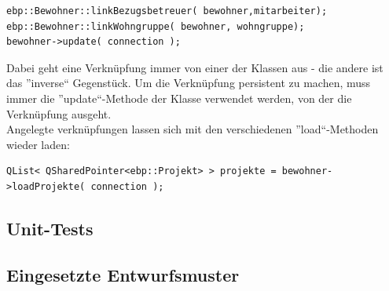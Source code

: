\begin{lstlisting}
ebp::Bewohner::linkBezugsbetreuer( bewohner,mitarbeiter);
ebp::Bewohner::linkWohngruppe( bewohner, wohngruppe);
bewohner->update( connection );
\end{lstlisting}
Dabei geht eine Verknüpfung immer von einer der Klassen aus - die andere ist das ''inverse`` Gegenstück.
Um die Verknüpfung persistent zu machen, muss immer die ''update``-Methode der Klasse verwendet werden, von der die Verknüpfung ausgeht.\\
Angelegte verknüpfungen lassen sich mit den verschiedenen ''load``-Methoden wieder laden:\\
\begin{lstlisting}
QList< QSharedPointer<ebp::Projekt> > projekte = bewohner->loadProjekte( connection );
\end{lstlisting}

\newpage

\subsection{Unit-Tests}

\newpage

\subsection{Eingesetzte Entwurfsmuster}
